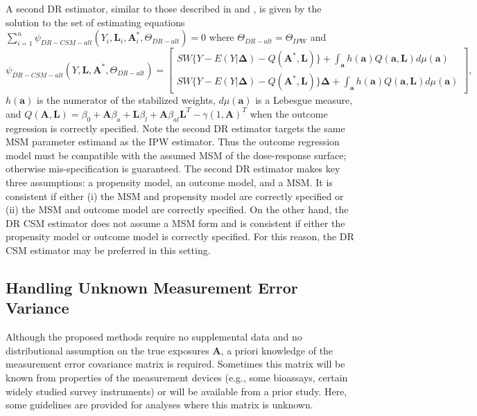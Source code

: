 \documentclass[useAMS,usenatbib,referee]{biom}
\begin{document}
A second DR estimator, similar to those described in \citet{robins2000b} and \citet{neugebauer2005}, is given by the solution to the set of estimating equations $\sum_{i=1}^{n} \psi_{DR-CSM-alt}(Y_{i}, \bm{L}_{i}, \bm{A}^{*}_{i}, \Theta_{DR-alt}) = 0$ where $\Theta_{DR-alt} = \Theta_{IPW}$ and
\begin{equation*}
    \psi_{DR-CSM-alt}(Y, \bm{L}, \bm{A}^{*}, \Theta_{DR-alt}) =
    \begin{bmatrix}
       SW \{ Y - E(Y | \bm{\Delta}) - Q(\bm{A}^{*}, \bm{L}) \} + \int_{\bm{a}} h(\bm{a})Q(\bm{a}, \bm{L})d\mu (\bm{a}) \\
       SW \{ Y - E(Y | \bm{\Delta}) - Q(\bm{A}^{*}, \bm{L}) \} \bm{\Delta} + \int_{\bm{a}} h(\bm{a})Q(\bm{a}, \bm{L})d\mu (\bm{a})
    \end{bmatrix},
\end{equation*}
$h(\bm{a})$ is the numerator of the stabilized weights, $d\mu (\bm{a})$ is a Lebesgue measure, and $Q(\bm{A}, \bm{L}) = \beta_{0} + \bm{A} \beta_{a} + \bm{L} \beta_{l} + \bm{A} \beta_{al}\bm{L}^{T} - \gamma (1, \bm{A})^{T}$ when the outcome regression is correctly specified. Note the second DR estimator targets the same MSM parameter estimand as the IPW estimator. Thus the outcome regression model must be compatible with the assumed MSM of the dose-response surface; otherwise mis-specification is guaranteed. The second DR estimator makes key three assumptions: a propensity model, an outcome model, and a MSM. It is consistent if either (i) the MSM and propensity model are correctly specified or (ii) the MSM and outcome model are correctly specified. On the other hand, the DR CSM estimator does not assume a MSM form and is consistent if either the propensity model or outcome model is correctly specified. For this reason, the DR CSM estimator may be preferred in this setting.

\subsection{Handling Unknown Measurement Error Variance}

Although the proposed methods require no supplemental data and no distributional assumption on the true exposures $\bm{A}$, a priori knowledge of the measurement error covariance matrix is required. Sometimes this matrix will be known from properties of the measurement devices (e.g., some bioassays, certain widely studied survey instruments) or will be available from a prior study. Here, some guidelines are provided for analyses where this matrix is unknown.
\end{document}
